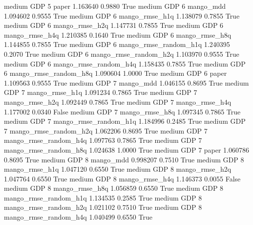     medium      GDP                 5                 paper   1.163640      0.9880    True
    medium      GDP                 6             mango_mdd   1.094602      0.9555    True
    medium      GDP                 6        mango_rmse_h1q   1.138079      0.7855    True
    medium      GDP                 6        mango_rmse_h2q   1.147731      0.7855    True
    medium      GDP                 6        mango_rmse_h4q   1.210385      0.1640    True
    medium      GDP                 6        mango_rmse_h8q   1.144855      0.7855    True
    medium      GDP                 6 mango_rmse_random_h1q   1.240395      0.2070    True
    medium      GDP                 6 mango_rmse_random_h2q   1.103970      0.9555    True
    medium      GDP                 6 mango_rmse_random_h4q   1.158435      0.7855    True
    medium      GDP                 6 mango_rmse_random_h8q   1.090604      1.0000    True
    medium      GDP                 6                 paper   1.109563      0.9555    True
    medium      GDP                 7             mango_mdd   1.046155      0.8695    True
    medium      GDP                 7        mango_rmse_h1q   1.091234      0.7865    True
    medium      GDP                 7        mango_rmse_h2q   1.092449      0.7865    True
    medium      GDP                 7        mango_rmse_h4q   1.177002      0.0340   False
    medium      GDP                 7        mango_rmse_h8q   1.097345      0.7865    True
    medium      GDP                 7 mango_rmse_random_h1q   1.184996      0.2485    True
    medium      GDP                 7 mango_rmse_random_h2q   1.062206      0.8695    True
    medium      GDP                 7 mango_rmse_random_h4q   1.097763      0.7865    True
    medium      GDP                 7 mango_rmse_random_h8q   1.024638      1.0000    True
    medium      GDP                 7                 paper   1.060786      0.8695    True
    medium      GDP                 8             mango_mdd   0.998207      0.7510    True
    medium      GDP                 8        mango_rmse_h1q   1.047120      0.6550    True
    medium      GDP                 8        mango_rmse_h2q   1.047764      0.6550    True
    medium      GDP                 8        mango_rmse_h4q   1.146373      0.0055   False
    medium      GDP                 8        mango_rmse_h8q   1.056859      0.6550    True
    medium      GDP                 8 mango_rmse_random_h1q   1.134535      0.2585    True
    medium      GDP                 8 mango_rmse_random_h2q   1.021102      0.7510    True
    medium      GDP                 8 mango_rmse_random_h4q   1.040499      0.6550    True
